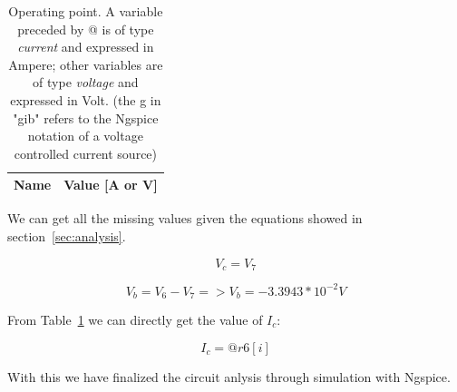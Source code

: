 \begin{table}[!ht]
  \centering
  \begin{tabular}{|l|r|}
    \hline    
    {\bf Name} & {\bf Value [A or V]} \\ \hline
    
  \end{tabular}
  \caption{Operating point. A variable preceded by @ is of type {\em current}
    and expressed in Ampere; other variables are of type {\it voltage} and expressed in
    Volt. (the g in "gib" refers to the Ngspice notation of a voltage controlled current source)}
  \label{tab:op}
\end{table}

We can get all the missing values given the equations showed in section~\ref{sec:analysis}.

\begin{equation}
  V_c = V_7
  \label{eq:1}
\end{equation}

\begin{equation}
  V_b = V_6 - V_7
  => V_b = -3.3943*10^{-2} V
\end{equation}

From Table~\ref{tab:op} we can directly get the value of $I_c$:

\begin{equation}
  I_c = @r6[i]
\end{equation}

With this we have finalized the circuit anlysis through simulation with Ngspice.










